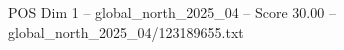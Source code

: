 \begin{textsample}{POS Dim 1 – global\_north\_2025\_04 – Score 30.00 – global\_north\_2025\_04/123189655.txt}
\end{textsample}
